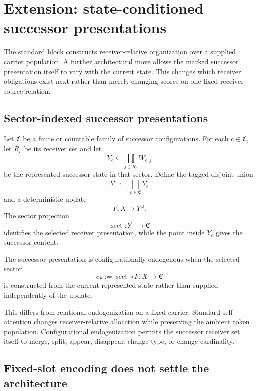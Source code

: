 \section{Extension: state-conditioned successor presentations}\label{sec:variable-population}

The standard block constructs receiver-relative organization over a supplied carrier population. A further architectural move allows the marked successor presentation itself to vary with the current state. This changes which receiver obligations exist next rather than merely changing scores on one fixed receiver--source relation.

\subsection{Sector-indexed successor presentations}

Let $\mathfrak C$ be a finite or countable family of successor configurations. For each $c\in\mathfrak C$, let $R_c$ be its receiver set and let
\[
Y_c\subseteq\prod_{j\in R_c}W_{c,j}
\]
be the represented successor state in that sector. Define the tagged disjoint union
\begin{equation}\label{eq:sector-state-space}
Y^{\sqcup}:=\bigsqcup_{c\in\mathfrak C}Y_c
\end{equation}
and a deterministic update
\[
F:X\to Y^{\sqcup}.
\]
The sector projection
\[
\operatorname{sect}:Y^{\sqcup}\to\mathfrak C
\]
identifies the selected receiver presentation, while the point inside $Y_c$ gives the successor content.

\begin{definition}\label{def:configurational-endogenization}
The successor presentation is configurationally endogenous when the selected sector
\[
c_F:=\operatorname{sect}\circ F:X\to\mathfrak C
\]
is constructed from the current represented state rather than supplied independently of the update.
\end{definition}

This differs from relational endogenization on a fixed carrier. Standard self-attention changes receiver-relative allocation while preserving the ambient token population. Configurational endogenization permits the successor receiver set itself to merge, split, appear, disappear, change type, or change cardinality.

\subsection{Fixed-slot encoding does not settle the architecture}

